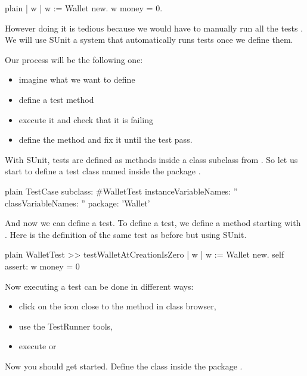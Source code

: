 \documentclass[10pt,twoside,english]{_support/latex/sbabook/sbabook}
\begin{document}
\begin{displaycode}{plain}
| w |
w := Wallet new.
w money = 0.
\end{displaycode}

However doing it is tedious because we would have to manually run all the tests . 
We will use SUnit a system that automatically runs tests once we define them. 

Our process will be the following one:

\begin{itemize}
\item imagine what we want to define
\item define a test method
\item execute it and check that it is failing
\item define the method and fix it until the test pass.
\end{itemize}

With SUnit, tests are defined as methods inside a class subclass from .
So let us start to define a test class named  inside the package .

\begin{displaycode}{plain}
TestCase subclass: #WalletTest
	instanceVariableNames: ''
	classVariableNames: ''
	package: 'Wallet'
\end{displaycode}

And now we can define a test. To define a test, we define a method starting with .
Here is the definition of the same test as before but using SUnit.  

\begin{displaycode}{plain}
WalletTest >> testWalletAtCreationIsZero
	| w |
	w := Wallet new.
	self assert: w money = 0
\end{displaycode}

Now executing a test can be done in different ways:

\begin{itemize}
\item click on the icon close to the method in class browser,
\item use the TestRunner tools, 
\item execute  or 
\end{itemize}

Now you should get started. Define the class  inside the package .
\end{document}
